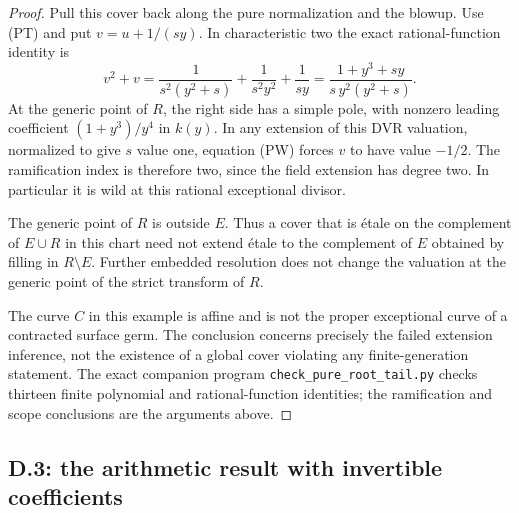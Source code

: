 \begin{proof}
Pull this cover back along the pure normalization and
the blowup.  Use (PT) and put
$v=u+1/(sy)$.  In characteristic two the exact
rational-function identity is
\[
 v^2+v
 =\frac{1}{s^2(y^2+s)}
       +\frac1{s^2y^2}+\frac1{sy}
 =\frac{1+y^3+sy}{s\,y^2(y^2+s)}.                    \tag{PW}
\]
At the generic point of $R$, the right side has a
simple pole, with nonzero leading coefficient
$(1+y^3)/y^4$ in $k(y)$.  In any extension of this
DVR valuation, normalized to give $s$ value one,
equation (PW) forces $v$ to have value $-1/2$.
The ramification index is therefore two, since the
field extension has degree two.  In particular it
is wild at this rational exceptional divisor.

The generic point of $R$ is outside $E$.  Thus a
cover that is \'etale on the complement of $E\cup R$
in this chart need not extend \'etale to the complement
of $E$ obtained by filling in $R\setminus E$.
Further embedded resolution does not change the
valuation at the generic point of the strict
transform of $R$.

The curve $C$ in this example is affine and is not
the proper exceptional curve of a contracted
surface germ.  The conclusion concerns precisely
the failed extension inference, not the existence
of a global cover violating any finite-generation
statement.  The exact companion program
\texttt{check\_pure\_root\_tail.py} checks thirteen
finite polynomial and rational-function identities;
the ramification and scope conclusions are the
arguments above.
\end{proof}

\subsection{D.3: the arithmetic result with invertible coefficients}

